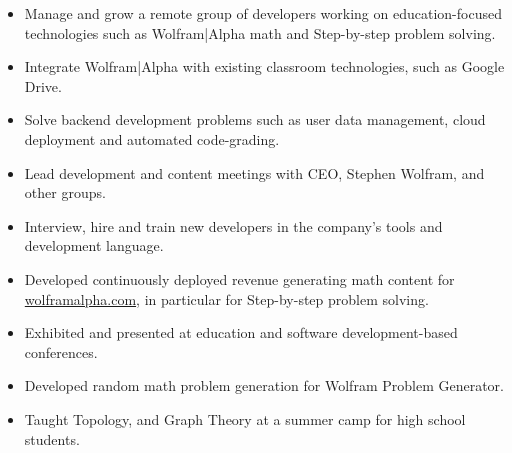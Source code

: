 \documentclass[11pt,a4paper,unicode]{moderncv}
\begin{document}
\vspace{-.1cm}
\cvline{}
{\begin{itemize} 
	  \item Manage and grow a remote group of developers working on education-focused technologies such as Wolfram|Alpha math and Step-by-step problem solving. 
	  \item Integrate Wolfram|Alpha with existing classroom technologies, such as Google Drive.
	  \item Solve backend development problems such as user data management, cloud deployment and automated code-grading. 
	  \item Lead development and content meetings with CEO, Stephen Wolfram, and other groups.
	  \item Interview, hire and train new developers in the company's tools and development language. 
 \end{itemize}}
\vspace{-.5cm}


\vspace{-.1cm}
\cvline{}
{\begin{itemize} 
	\item Developed continuously deployed revenue generating math content for \url{wolframalpha.com}, in particular for Step-by-step problem solving.
	 \item Exhibited and presented at education and software development-based conferences.
	  \item Developed random math problem generation for Wolfram Problem Generator.
	  \item Taught Topology, and Graph Theory at a summer camp for high school students.
\end{itemize}}
\vspace{-.5cm}



\end{document}
